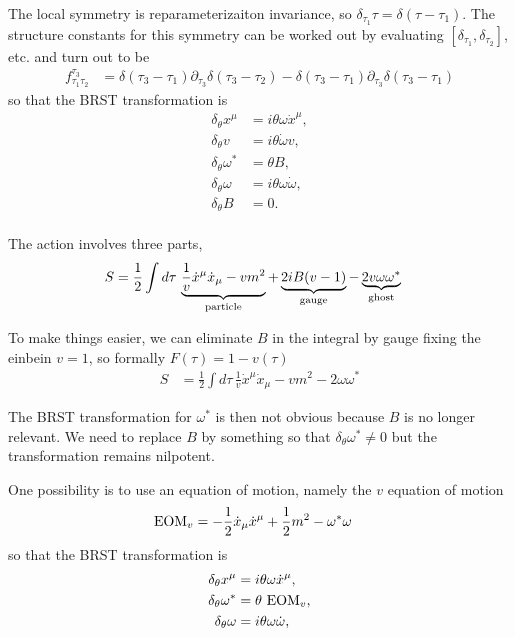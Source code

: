 \documentclass[notitlepage,amsmath,amssymb,aps, pra, 10pt]{revtex4-1}
\begin{document}
    The local symmetry is reparameterizaiton invariance, so $\delta_{\tau_1} \tau = \delta(\tau -\tau_1)$. The structure constants for this symmetry can be worked out by evaluating $[\delta_{\tau_1}, \delta_{\tau_2}]$, etc. and turn out to be
    \begin{align}
      f^{\tau_3}_{\tau_1 \tau_2} &= \delta(\tau_3-\tau_1)\partial_{\tau_3} \delta(\tau_3 - \tau_2) -\delta(\tau_3-\tau_1)\partial_{\tau_3} \delta(\tau_3 - \tau_1)
    \end{align}
    so that the BRST transformation is
    \begin{align}
    \delta_{\theta}x^{\mu} &= i \theta\omega \dot x^{\mu},\\
    \delta_{\theta}v &= i \theta\dot \omega v,\\
    \delta_{\theta}\omega^* &=  \theta B,\\
    \delta_{\theta}\omega &= i \theta\omega \dot \omega,\\
    \delta_{\theta} B &=0.\\
    \end{align}

    The action involves three parts,
    \begin{align}
        S &= \frac{1}{2} \int d\tau \, \underbrace{\frac{1}{v}\dot x^{\mu}\dot x_{\mu} - v m^2}_{\rm particle}  +\underbrace{2iB(v-1)}_{\rm gauge} - \underbrace{2v\omega \omega^*}_{\rm ghost}
    \end{align}

    To make things easier, we can eliminate $B$ in the integral by gauge fixing  the einbein $v=1$, so formally $F(\tau) = 1 - v(\tau)$
    \begin{align}
        S &= \frac{1}{2} \int d\tau \, \frac{1}{v}\dot x^{\mu}\dot x_{\mu} - v m^2-2\omega \omega^*
    \end{align}

    The BRST transformation for $\omega^*$ is then not obvious because $B$ is no longer relevant. We need to replace $B$ by something so that $\delta_{\theta} \omega ^* \neq 0 $ but the transformation remains nilpotent.

    One possibility is to use an equation of motion, namely the $v$ equation of motion
    \begin{align}
        {\rm EOM}_{v} &= -\frac{1}{2} \dot x_{\mu} \dot x^{\mu} + \frac{1}{2}m^2 - \omega^* \omega
    \end{align}
    so that the BRST transformation is
    \begin{align}
    \delta_{\theta}x^{\mu} &= i \theta\omega \dot x^{\mu},\\
    \delta_{\theta}\omega^* &=  \theta \ {\rm EOM}_{v},\\
    \delta_{\theta}\omega &= i \theta\omega \dot \omega,\\
    \end{align}
\end{document}
